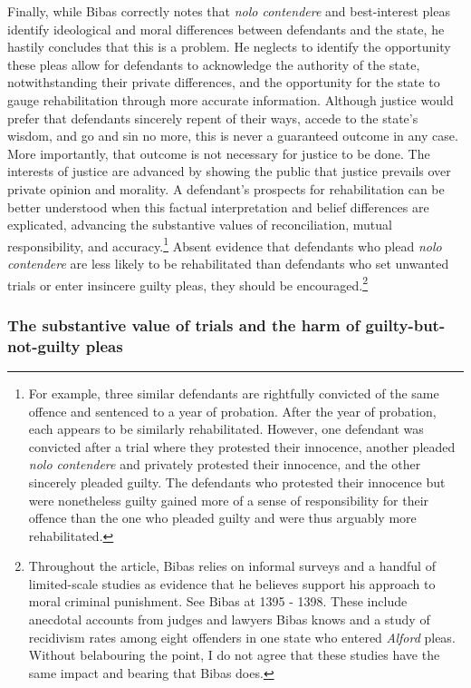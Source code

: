 Finally, while Bibas correctly notes that \textit{nolo contendere} and best-interest pleas identify ideological and moral differences between defendants and the state, he hastily concludes that this is a problem. He neglects to identify the opportunity these pleas allow for defendants to acknowledge the authority of the state, notwithstanding their private differences, and the opportunity for the state to gauge rehabilitation through more accurate information. Although justice would prefer that defendants sincerely repent of their ways, accede to the state's wisdom, and go and sin no more, this is never a guaranteed outcome in any case. More importantly, that outcome is not necessary for justice to be done. The interests of justice are advanced by showing the public that justice prevails over private opinion and morality. A defendant's prospects for rehabilitation can be better understood when this factual interpretation and belief differences are explicated, advancing the substantive values of reconciliation, mutual responsibility, and accuracy.\footnote{For example, three similar defendants are rightfully convicted of the same offence and sentenced to a year of probation. After the year of probation, each appears to be similarly rehabilitated. However, one defendant was convicted after a trial where they protested their innocence, another pleaded \textit{nolo contendere} and privately protested their innocence, and the other sincerely pleaded guilty. The defendants who protested their innocence but were nonetheless guilty gained more of a sense of responsibility for their offence than the one who pleaded guilty and were thus arguably more rehabilitated.} Absent evidence that defendants who plead \textit{nolo contendere} are less likely to be rehabilitated than defendants who set unwanted trials or enter insincere guilty pleas, they should be encouraged.\footnote{Throughout the article, Bibas relies on informal surveys and a handful of limited-scale studies as evidence that he believes support his approach to moral criminal punishment. See Bibas at 1395 - 1398. These include anecdotal accounts from judges and lawyers Bibas knows and a study of recidivism rates among eight offenders in one state who entered \textit{Alford} pleas. Without belabouring the point, I do not agree that these studies have the same impact and bearing that Bibas does.} 

\subsubsection{The substantive value of trials and the harm of guilty-but-not-guilty pleas}

